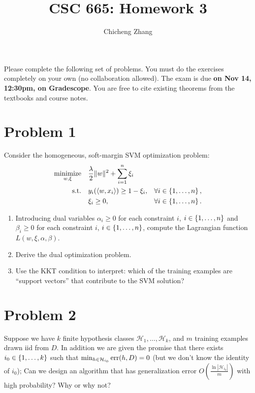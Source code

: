 \documentclass{article}
\title{CSC 665: Homework 3}
\author{Chicheng Zhang}
\DeclareMathOperator*{\err}{{\rm err}}
\DeclareMathOperator*{\minimize}{{\rm minimize}}
\DeclareMathOperator*{\st}{{\rm s.t.}}
\newcommand{\Xcal}{\mathcal{X}} %
\newcommand{\Ycal}{\mathcal{Y}} %
\newcommand{\Hcal}{\mathcal{H}} %
\newcommand{\inner}[2]{\left\langle #1,#2 \right\rangle}
\begin{document}
\maketitle

Please complete the following set of problems. You must do the exercises completely on your own (no collaboration allowed).
The exam is due \textbf{on Nov 14, 12:30pm, on Gradescope}. You are free to
cite existing theorems from the textbooks and course notes.


\section*{Problem 1}
Consider the homogeneous, soft-margin SVM optimization problem:
\begin{align}
  \minimize_{w,\xi} \quad & \frac\lambda 2 \| w \|^2 + \sum_{i=1}^n \xi_i & \label{eqn:svm-d} \\
    \st \quad & y_i(\inner{w}{x_i}) \geq 1 - \xi_i, &\forall i \in \cbr{1,\ldots,n}, \\
    & \xi_i \geq 0, &\forall i \in \cbr{1,\ldots,n}. \nonumber
\end{align}
\begin{enumerate}
\item Introducing dual variables $\alpha_i \geq 0$ for each constraint $i$, $i \in \cbr{1,\ldots,n}$ and $\beta_i \geq 0$ for each constraint $i$, $i \in \cbr{1,\ldots,n}$,
compute the Lagrangian function $L(w,\xi,\alpha,\beta)$.

\item Derive the dual optimization problem.

\item Use the KKT condition to interpret: which of the training examples are ``support vectors'' that contribute to the SVM solution?

\end{enumerate}

\section*{Problem 2}
Suppose we have $k$ finite hypothesis classes $\Hcal_1, \ldots, \Hcal_k$, and $m$ training examples drawn iid from $D$. In addition we are given the promise that there exists $i_0 \in \cbr{1,\ldots,k}$ such that $\min_{h \in \Hcal_{i_0}} \err(h, D) = 0$ (but we don't know the identity of $i_0$); Can we design an algorithm that has generalization error $O(\frac{\ln|\Hcal_{i_0}|}{m})$ with high probability? Why or why not?
\end{document}
